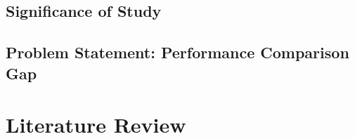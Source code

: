\documentclass{erauthesis}
\begin{document}
\section{Significance of Study} \label{significance_of_study}


\section{Problem Statement: Performance Comparison Gap} \label{problem_statement1}


\chapter{Literature Review} \label{litReview}







\end{document}
